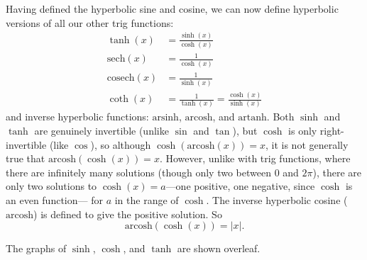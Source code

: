 \documentclass{article}
\newcommand{\sech}{\mathrm{sech}}
\newcommand{\cosech}{\mathrm{cosech}}
\newcommand{\arsinh}{\mathrm{arsinh}}
\newcommand{\arcosh}{\mathrm{arcosh}}
\newcommand{\artanh}{\mathrm{artanh}}
\begin{document}
Having defined the hyperbolic sine and cosine, we can now define hyperbolic versions of all our other trig functions:
\begin{align*}
	\tanh(x)&=\frac{\sinh(x)}{\cosh(x)}\\
	\sech(x)&=\frac{1}{\cosh(x)}\\
	\cosech(x)&=\frac{1}{\sinh(x)}\\
	\coth(x)&=\frac{1}{\tanh(x)}=\frac{\cosh(x)}{\sinh(x)}
\end{align*}
and inverse hyperbolic functions: $\arsinh$, $\arcosh$, and $\artanh$. Both $\sinh$ and $\tanh$ are genuinely invertible (unlike $\sin$ and $\tan$), but $\cosh$ is only right-invertible (like $\cos$), so although $\cosh(\arcosh(x))=x$, it is not generally true that $\arcosh(\cosh(x))=x$. However, unlike with trig functions, where there are infinitely many solutions (though only two between $0$ and $2\pi$), there are only two solutions to $\cosh(x)=a$---one positive, one negative, since $\cosh$ is an even function--- for $a$ in the range of $\cosh$. The inverse hyperbolic cosine ($\arcosh$) is defined to give the positive solution. So
\[\arcosh(\cosh(x))=|x|.\]


The graphs of $\sinh$, $\cosh$, and $\tanh$ are shown overleaf.


\begin{center}
\end{center}




\clearpage
\end{document}
